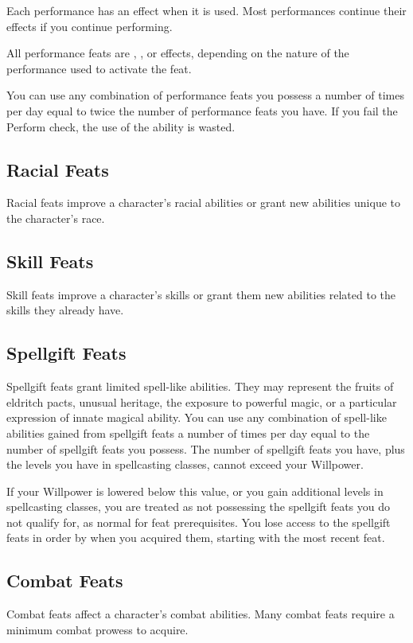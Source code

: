 Each performance has an effect when it is used.
Most performances continue their effects if you continue performing.

All performance feats are , , or  effects, depending on the nature of the performance used to activate the feat.

You can use any combination of performance feats you possess a number of times per day equal to twice the number of performance feats you have.
If you fail the Perform check, the use of the ability is wasted.

\subsection{Racial Feats}\label{Racial Feats}
Racial feats improve a character's racial abilities or grant new abilities unique to the character's race.

\subsection{Skill Feats}
Skill feats improve a character's skills or grant them new abilities related to the skills they already have.

\subsection{Spellgift Feats}
Spellgift feats grant limited spell-like abilities.
They may represent the fruits of eldritch pacts, unusual heritage, the exposure to powerful magic, or a particular expression of innate magical ability.
You can use any combination of spell-like abilities gained from spellgift feats a number of times per day equal to the number of spellgift feats you possess.
The number of spellgift feats you have, plus the levels you have in spellcasting classes, cannot exceed your Willpower.

If your Willpower is lowered below this value, or you gain additional levels in spellcasting classes, you are treated as not possessing the spellgift feats you do not qualify for, as normal for feat prerequisites.
You lose access to the spellgift feats in order by when you acquired them, starting with the most recent feat.

\subsection{Combat Feats}
Combat feats affect a character's combat abilities.
Many combat feats require a minimum combat prowess to acquire.

